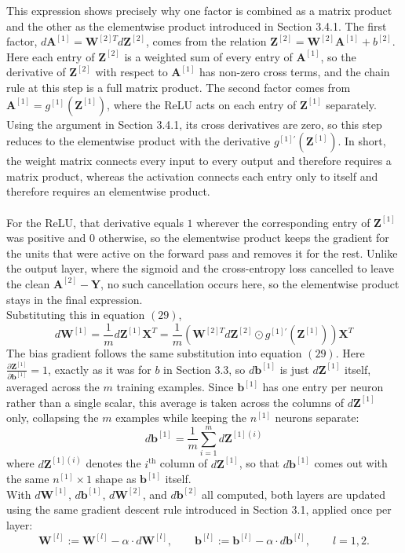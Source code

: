 \documentclass{article}
\begin{document}
This expression shows precisely why one factor is combined as a matrix product and the other as the elementwise product introduced in Section 3.4.1. The first factor, $d\mathbf{A}^{[1]} = \mathbf{W}^{[2]T} d\mathbf{Z}^{[2]}$, comes from the relation $\mathbf{Z}^{[2]} = \mathbf{W}^{[2]}\mathbf{A}^{[1]} + b^{[2]}$. Here each entry of $\mathbf{Z}^{[2]}$ is a weighted sum of every entry of $\mathbf{A}^{[1]}$, so the derivative of $\mathbf{Z}^{[2]}$ with respect to $\mathbf{A}^{[1]}$ has non-zero cross terms, and the chain rule at this step is a full matrix product. The second factor comes from $\mathbf{A}^{[1]} = g^{[1]}(\mathbf{Z}^{[1]})$, where the ReLU acts on each entry of $\mathbf{Z}^{[1]}$ separately. Using the argument in Section 3.4.1, its cross derivatives are zero, so this step reduces to the elementwise product with the derivative $g^{[1]\prime}(\mathbf{Z}^{[1]})$. In short, the weight matrix connects every input to every output and therefore requires a matrix product, whereas the activation connects each entry only to itself and therefore requires an elementwise product. 
\\\\
For the ReLU, that derivative equals $1$ wherever the corresponding entry of $\mathbf{Z}^{[1]}$ was positive and $0$ otherwise, so the elementwise product keeps the gradient for the units that were active on the forward pass and removes it for the rest. Unlike the output layer, where the sigmoid and the cross-entropy loss cancelled to leave the clean $\mathbf{A}^{[2]} - \mathbf{Y}$, no such cancellation occurs here, so the elementwise product stays in the final expression.
\\
Substituting this in equation $(29)$,
\begin{equation}
    d\mathbf{W}^{[1]} = \frac{1}{m} d\mathbf{Z}^{[1]} \mathbf{X}^T = \frac{1}{m}\left(\mathbf{W}^{[2]T} d\mathbf{Z}^{[2]} \odot g^{[1]\prime}(\mathbf{Z}^{[1]})\right)\mathbf{X}^T
\end{equation}
The bias gradient follows the same substitution into equation $(29)$. Here $\frac{\partial \mathbf{Z}^{[1]}}{\partial \mathbf{b}^{[1]}}=1$, exactly as it was for $b$ in Section 3.3, so $d\mathbf{b}^{[1]}$ is just $d\mathbf{Z}^{[1]}$ itself, averaged across the $m$ training examples. Since $\mathbf{b}^{[1]}$ has one entry per neuron rather than a single scalar, this average is taken across the columns of $d\mathbf{Z}^{[1]}$ only, collapsing the $m$ examples while keeping the $n^{[1]}$ neurons separate:
\begin{equation}
    d\mathbf{b}^{[1]} = \frac{1}{m}\sum_{i=1}^{m} d\mathbf{Z}^{[1](i)}
\end{equation}
where $d\mathbf{Z}^{[1](i)}$ denotes the $i^{\text{th}}$ column of $d\mathbf{Z}^{[1]}$, so that $d\mathbf{b}^{[1]}$ comes out with the same $n^{[1]} \times 1$ shape as $\mathbf{b}^{[1]}$ itself.
\\
With $d\mathbf{W}^{[1]}$, $d\mathbf{b}^{[1]}$, $d\mathbf{W}^{[2]}$, and $d\mathbf{b}^{[2]}$ all computed, both layers are updated using the same gradient descent rule introduced in Section 3.1, applied once per layer:
$$\mathbf{W}^{[l]} := \mathbf{W}^{[l]} - \alpha \cdot d\mathbf{W}^{[l]}, \qquad \mathbf{b}^{[l]} := \mathbf{b}^{[l]} - \alpha \cdot d\mathbf{b}^{[l]}, \qquad l = 1, 2.$$
\end{document}
